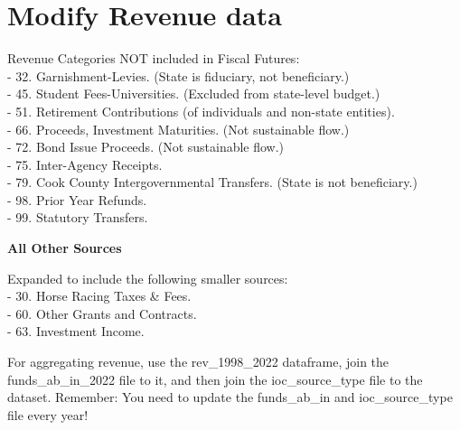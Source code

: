 \documentclass[
  letterpaper,
  DIV=11,
  numbers=noendperiod]{scrreport}
\begin{document}
\hypertarget{modify-revenue-data}{%
\section{Modify Revenue data}\label{modify-revenue-data}}

Revenue Categories NOT included in Fiscal Futures:\\
- 32. Garnishment-Levies. (State is fiduciary, not beneficiary.)\\
- 45. Student Fees-Universities. (Excluded from state-level budget.)\\
- 51. Retirement Contributions (of individuals and non-state
entities).\\
- 66. Proceeds, Investment Maturities. (Not sustainable flow.)\\
- 72. Bond Issue Proceeds. (Not sustainable flow.)\\
- 75. Inter-Agency Receipts.\\
- 79. Cook County Intergovernmental Transfers. (State is not
beneficiary.)\\
- 98. Prior Year Refunds.\\
- 99. Statutory Transfers.

\textbf{All Other Sources}

Expanded to include the following smaller sources:\\
- 30. Horse Racing Taxes \& Fees.\\
- 60. Other Grants and Contracts.\\
- 63. Investment Income.

For aggregating revenue, use the rev\_1998\_2022 dataframe, join the
funds\_ab\_in\_2022 file to it, and then join the ioc\_source\_type file
to the dataset. Remember: You need to update the funds\_ab\_in and
ioc\_source\_type file every year!
\end{document}
